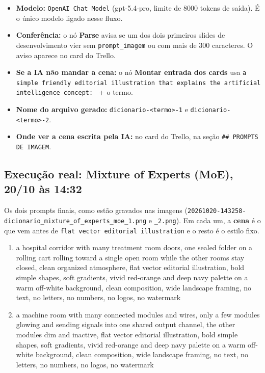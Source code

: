 \begin{itemize}
\item 
\textbf{Modelo:} \texttt{OpenAI Chat Model} (gpt-5.4-pro, limite de 8000 tokens de saída). É o único modelo ligado nesse fluxo.


\item 
\textbf{Conferência:} o nó \textbf{Parse} avisa se um dos dois primeiros slides de desenvolvimento vier sem \nolinkurl{prompt_imagem} ou com mais de 300 caracteres. O aviso aparece no card do Trello.


\item 
\textbf{Se a IA não mandar a cena:} o nó \textbf{Montar entrada dos cards} usa \texttt{a simple friendly editorial illustration that explains the artificial intelligence concept: } + o termo.


\item 
\textbf{Nome do arquivo gerado:} \nolinkurl{dicionario-<termo>-1} e \nolinkurl{dicionario-<termo>-2}.


\item 
\textbf{Onde ver a cena escrita pela IA:} no card do Trello, na seção \texttt{\#\# PROMPTS DE IMAGEM}.


\end{itemize}

\subsection*{Execução real: Mixture of Experts (MoE), 20/10 às 14:32}

Os dois prompts finais, como estão gravados nas imagens (\nolinkurl{20261020-143258-dicionario_mixture_of_experts_moe_1.png} e \nolinkurl{_2.png}). Em cada um, a \textbf{cena} é o que vem antes de \texttt{flat vector editorial illustration} e o resto é o estilo fixo.

\begin{enumerate}
\item 
\begin{sourcequote}
a hospital corridor with many treatment room doors, one sealed folder on a rolling cart rolling toward a single open room while the other rooms stay closed, clean organized atmosphere, flat vector editorial illustration, bold simple shapes, soft gradients, vivid red-orange and deep navy palette on a warm off-white background, clean composition, wide landscape framing, no text, no letters, no numbers, no logos, no watermark

\end{sourcequote}


\item 
\begin{sourcequote}
a machine room with many connected modules and wires, only a few modules glowing and sending signals into one shared output channel, the other modules dim and inactive, flat vector editorial illustration, bold simple shapes, soft gradients, vivid red-orange and deep navy palette on a warm off-white background, clean composition, wide landscape framing, no text, no letters, no numbers, no logos, no watermark

\end{sourcequote}


\end{enumerate}

